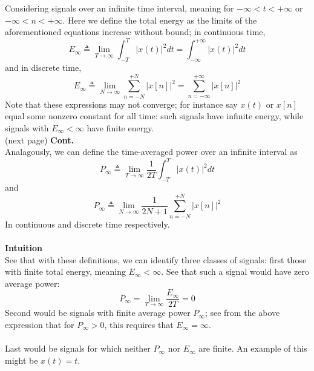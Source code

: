 \documentclass{report}
\begin{document}
Considering signals over an infinite time interval, meaning for $-\infty<t<+\infty$ or $-\infty<n<+\infty$. 
Here we define the total energy as the limits of the aforementioned equations increase without bound; in continuous
time,
\begin{equation*}
E_\infty\triangleq\lim_{T\to\infty}\int^T_{-T}|x(t)|^2dt
=\int^{+\infty}_{-\infty}|x(t)|^2dt
\end{equation*}
and in discrete time,
\begin{equation*}
E_\infty\triangleq\lim_{N\to\infty}\sum^{+N}_{n=-N}|x[n]|^2=\sum^{+\infty}_{n=-\infty}|x[n]|^2
\end{equation*}
Note that these expressions may not converge; for instance say $x(t)$ or $x[n]$ equal some nonzero constant for 
all time: such signals have infinite energy, while signals with $E_\infty<\infty$ have finite energy.\\
(next page)\newpage
\noindent\textbf{Cont.}\\
Analagously, we can define the time-averaged power over an infinite interval as
\begin{equation*}
P_\infty\triangleq\lim_{T\to\infty}\frac{1}{2T}\int^T_{-T}|x(t)|^2dt
\end{equation*}
and
\begin{equation*}
P_\infty\triangleq\lim_{N\to\infty}\frac{1}{2N+1}\sum^{+N}_{n=-N}|x[n]|^2
\end{equation*}
In continuous and discrete time respectively. \\
\vspace{1mm}\\
\textbf{Intuition}\\
See that with these definitions, we can identify three classes of signals: first those with finite total energy,
meaning $E_\infty<\infty$. See that such a signal would have zero average power:
\begin{equation*}
P_\infty=\lim_{T\to\infty}\frac{E_\infty}{2T}=0
\end{equation*}
Second would be signals with finite average power $P_\infty$; see from the above expression that for $P_\infty>0$,
this requires that $E_\infty=\infty$.\\
\vspace{1mm}\\
Last would be signals for which neither $P_\infty$ nor $E_\infty$ are finite. An example of this might be $x(t)=t$.
\end{document}
